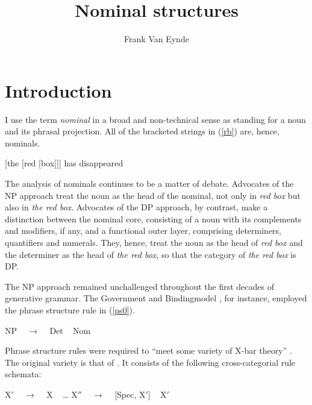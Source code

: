 \documentclass[output=paper,biblatex,babelshorthands,newtxmath,draftmode,colorlinks,citecolor=brown]{langscibook}
\author{Frank {Van Eynde}\orcid{0000-0002-6172-442X}\affiliation{University of Leuven}}
\title{Nominal structures}
\begin{document}
\maketitle
\label{chap-np}

\section{Introduction}


I use the term \emph{nominal} in a broad and non-technical sense as standing 
for a noun and its phrasal projection. 
All of the bracketed strings in (\ref{rb}) are, hence, nominals. 

\begin{exe} 
\ex\label{rb}  
{}[the [red [box]]] has disappeared
\end{exe} 
  
\noindent
The analysis of nominals continues to be a matter of debate. 
Advocates of the NP approach treat the noun as the head of the nominal, 
not only in \emph{red box} but also in \emph{the red box}. 
Advocates of the DP approach, by contrast, 
make a distinction between the nominal core, 
consisting of a noun with its complements and modifiers, if any,  
and a functional outer layer, comprising determiners, quantifiers and numerals. 
They, hence, treat the noun as the head of \emph{red box} and the determiner as
the head of \emph{the red box}, so that the category of \emph{the red box} is DP. 

The NP approach remained unchallenged throughout the first decades of generative 
grammar. The Government and Binding\indexgb model \citep{Chomsky81}, for instance, 
employed the phrase structure rule in (\ref{ps0}). 

\begin{exe} 
\ex\label{ps0}     NP ~ $\rightarrow$ ~ Det ~ Nom
\end{exe}

\noindent
Phrase structure rules were required to ``meet some variety of X-bar theory'' \citep[5]{Chomsky81}. 
The original variety is that of \citet{Chomsky70}. It consists of the following
cross-categorial rule schemata:

\begin{exe} 
\ex\label{xbar} 
\begin{xlist} 
\ex\label{xbar1}   X$'$ ~ $\rightarrow$ ~ X ~  \ldots
\ex\label{xbar2}   X$''$ ~ $\rightarrow$ ~ [Spec, X$'$] ~ X$'$ 
\end{xlist} 
\end{exe} 
\end{document}
